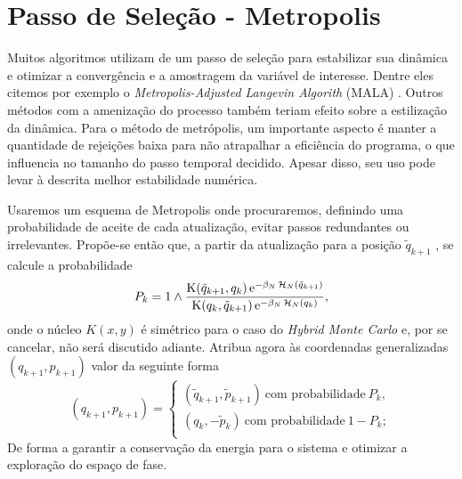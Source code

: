 \section{Passo de Seleção - Metropolis}

Muitos algoritmos utilizam  de um passo de seleção para estabilizar sua dinâmica e otimizar a convergência e a amostragem da variável de interesse. Dentre eles citemos por exemplo o \textit{Metropolis-Adjusted Langevin Algorith} (MALA) \cite[Anexo~C]{leimmolecular}. Outros métodos com a amenização do processo também teriam efeito sobre a estilização da dinâmica. Para o método de metrópolis, um importante aspecto é manter a quantidade de rejeições baixa para não atrapalhar a eficiência do programa, o que influencia no tamanho do passo temporal decidido. Apesar disso, seu uso pode levar à descrita melhor estabilidade numérica.

Usaremos um esquema de Metropolis onde procuraremos, definindo uma probabilidade de aceite de cada atualização, evitar passos redundantes ou irrelevantes. Propõe-se então que, a partir da atualização para a posição $\tilde{q}_{k+1}$ \cite{Chafa2018}, se calcule a probabilidade
\begin{equation}
P_k = 1 \wedge \frac{\operatorname{K}(\tilde{q}_{k+1}, q_k) \operatorname{\textrm e}^{-\beta_N \operatorname{\mathcal{H}}_N(\tilde{q}_{k+1})}}{\operatorname{K}(q_k, \tilde{q}_{k+1}) \operatorname{\textrm e}^{-\beta_N \operatorname{\mathcal{H}}_N(q_{k})}},
\label{Equation: Pk}
\end{equation}
onde o núcleo $K(x, y)$ é simétrico \cite{Chafa2018} para o caso do \textit{Hybrid Monte Carlo} e, por se cancelar, não será discutido adiante. Atribua agora às coordenadas generalizadas $(q_{k+1}, p_{k+1})$ valor da seguinte forma
\begin{equation}
	(q_{k+1}, p_{k+1}) =
\begin{cases}
	(\tilde{q}_{k+1}, \tilde{p}_{k+1}) \ \text{com probabilidade} \ P_k, \\
	(q_k, -\tilde{p}_{k}) \ \text{com probabilidade} \ 1-P_k; \\
\end{cases}
\label{Equation: Metropolis}
\end{equation}
De forma a garantir a conservação da energia para o sistema e otimizar a exploração do espaço de fase.